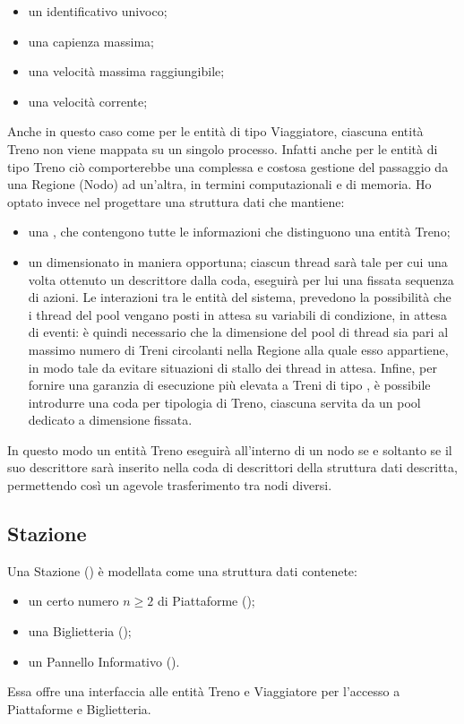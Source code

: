 		\begin{itemize}
			\item un identificativo univoco;
			\item una capienza massima;
			\item una velocità massima raggiungibile;
			\item una velocità corrente;
		\end{itemize}
	
	Anche in questo caso come per le entità di tipo Viaggiatore, ciascuna entità Treno non viene mappata su un singolo processo. Infatti anche per le entità di tipo Treno ciò comporterebbe una complessa e costosa gestione del passaggio da una Regione (Nodo) ad un'altra, in termini computazionali e di memoria. 
	Ho optato invece nel progettare una struttura dati  che mantiene:
		\begin{itemize}
			\item una , che contengono tutte le informazioni che distinguono una entità Treno;
			\item un  dimensionato in maniera opportuna; ciascun thread sarà tale per cui una volta ottenuto un descrittore dalla coda, eseguirà per lui una fissata sequenza di azioni. Le interazioni tra le entità del sistema, prevedono la possibilità che i thread del pool vengano posti in attesa su variabili di condizione, in attesa di eventi: è quindi necessario che la dimensione del pool di thread sia pari al massimo numero di Treni circolanti nella Regione alla quale esso appartiene, in modo tale da evitare situazioni di stallo dei thread in attesa. Infine, per fornire una garanzia di esecuzione più elevata a Treni di tipo , è possibile introdurre una coda per tipologia di Treno, ciascuna servita da un pool dedicato a dimensione fissata.
		\end{itemize}
	In questo modo un entità Treno eseguirà all'interno di un nodo se e soltanto se il suo descrittore sarà inserito nella coda di descrittori della struttura dati descritta, permettendo così un agevole trasferimento tra nodi diversi.
				
	\subsection{Stazione} \label{subsec:station}
	
	Una Stazione () è modellata come una struttura dati contenete:
		\begin{itemize}
			\item un certo numero $ n \ge 2$ di Piattaforme ();
			\item una Biglietteria ();
			\item un Pannello Informativo ().
		\end{itemize}
	Essa offre una interfaccia alle entità Treno e Viaggiatore per l'accesso a Piattaforme e Biglietteria.
		
